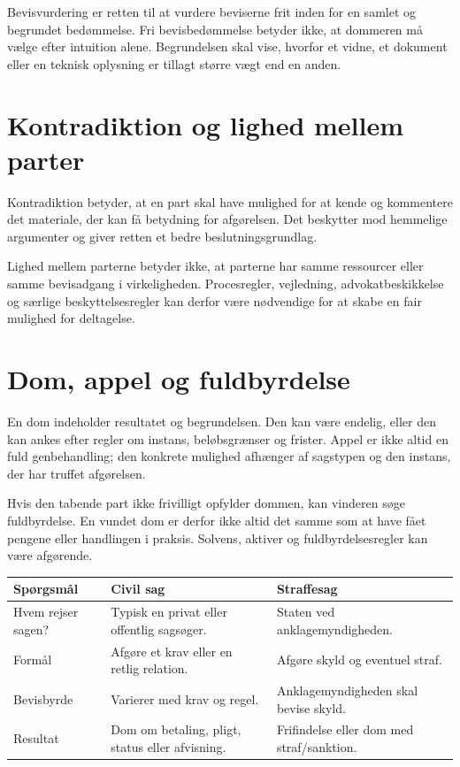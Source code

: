 Bevisvurdering er retten til at vurdere beviserne frit inden for en samlet og begrundet bedømmelse. Fri bevisbedømmelse betyder ikke, at dommeren må vælge efter intuition alene. Begrundelsen skal vise, hvorfor et vidne, et dokument eller en teknisk oplysning er tillagt større vægt end en anden.

\section{Kontradiktion og lighed mellem parter}

Kontradiktion betyder, at en part skal have mulighed for at kende og kommentere det materiale, der kan få betydning for afgørelsen. Det beskytter mod hemmelige argumenter og giver retten et bedre beslutningsgrundlag.

Lighed mellem parterne betyder ikke, at parterne har samme ressourcer eller samme bevisadgang i virkeligheden. Procesregler, vejledning, advokatbeskikkelse og særlige beskyttelsesregler kan derfor være nødvendige for at skabe en fair mulighed for deltagelse.

\section{Dom, appel og fuldbyrdelse}

En dom indeholder resultatet og begrundelsen. Den kan være endelig, eller den kan ankes efter regler om instans, beløbsgrænser og frister. Appel er ikke altid en fuld genbehandling; den konkrete mulighed afhænger af sagstypen og den instans, der har truffet afgørelsen.

Hvis den tabende part ikke frivilligt opfylder dommen, kan vinderen søge fuldbyrdelse. En vundet dom er derfor ikke altid det samme som at have fået pengene eller handlingen i praksis. Solvens, aktiver og fuldbyrdelsesregler kan være afgørende.

\begin{tabularx}{\textwidth}{@{}>{\RaggedRight\arraybackslash}p{2.6cm}X X@{}}
\toprule
\textbf{Spørgsmål} & \textbf{Civil sag} & \textbf{Straffesag} \\
\midrule
Hvem rejser sagen? & Typisk en privat eller offentlig sagsøger. & Staten ved anklagemyndigheden. \\
Formål & Afgøre et krav eller en retlig relation. & Afgøre skyld og eventuel straf. \\
Bevisbyrde & Varierer med krav og regel. & Anklagemyndigheden skal bevise skyld. \\
Resultat & Dom om betaling, pligt, status eller afvisning. & Frifindelse eller dom med straf/sanktion. \\
\bottomrule
\end{tabularx}


